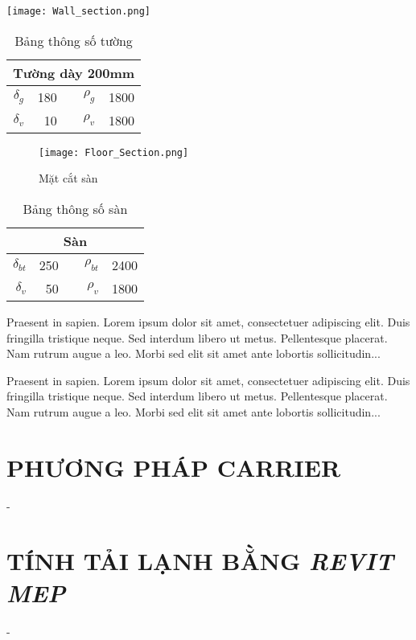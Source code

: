 




\begin{minipage}[H]{.5\linewidth}
	\centering
	\texttt{[image: Wall\_section.png]}
	\label{H:tstuong}
\end{minipage}
\begin{minipage}[H]{.5\linewidth}
	\begin{table}[H]
		\centering
		\begin{tabular}{|r|r|r|r|r|}
			\toprule
			\multicolumn{5}{|c|}{\textbf{Tường dày 200mm}} \\
			\midrule
			$\delta_{g}$ & 180   &       & $\rho_{g}$  & 1800 \\
			\midrule
			$\delta_{v}$ & 10    &       & $\rho_{v}$  & 1800 \\
			\bottomrule
		\end{tabular}%
		\caption{Bảng thông số tường}
		\label{B:tstuong}
	\end{table}
\end{minipage}




\begin{figure}[H]
		\centering
		\texttt{[image: Floor\_Section.png]}
		\caption{Mặt cắt sàn}
		\label{H:tssan}
\end{figure}

\begin{wraptable}{l}{0.4\textwidth}
		\centering
		\begin{tabular}{|r|r|r|r|r|}
			\toprule
			\multicolumn{5}{|c|}{\textbf{Sàn}} \\
			\midrule
			$\delta_{bt}$ & 250 &      & $\rho_{bt}$ & 2400 \\
			\midrule
			$\delta_{v}$ & 50   &      & $\rho_{v}$ & 1800 \\
			\bottomrule
		\end{tabular}%
		\caption{Bảng thông số sàn}
		\label{B:tssan}%
\end{wraptable}

Praesent in sapien. Lorem ipsum dolor sit amet, consectetuer 
adipiscing elit. Duis fringilla tristique neque. Sed interdum 
libero ut metus. Pellentesque placerat. Nam rutrum augue a leo. 
Morbi sed elit sit amet ante lobortis sollicitudin...

Praesent in sapien. Lorem ipsum dolor sit amet, consectetuer 
adipiscing elit. Duis fringilla tristique neque. Sed interdum 
libero ut metus. Pellentesque placerat. Nam rutrum augue a leo. 
Morbi sed elit sit amet ante lobortis sollicitudin...



\section{PHƯƠNG PHÁP CARRIER}
-

\section{TÍNH TẢI LẠNH BẰNG \emph{REVIT MEP}}
- 
